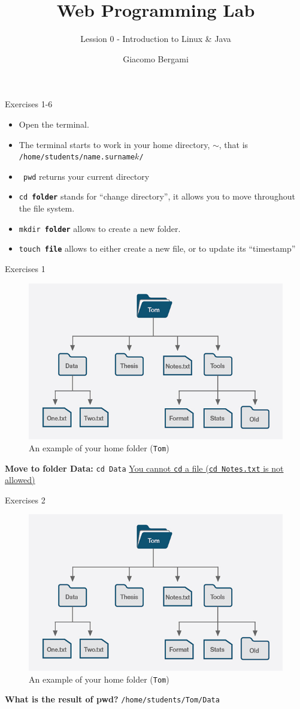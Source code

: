 \documentclass{beamer}
\title{Web Programming Lab}
\subtitle{Lession 0 - Introduction to Linux \& Java}
\author{Giacomo Bergami}
\institute{University of Bologna}
\begin{document}
  \begin{frame}{Exercises 1-6}
    \begin{itemize}
    	\item Open the terminal. 
    	\item The terminal starts to work in your home directory, $\sim$, that is \texttt{/home/students/name.surname$k$/}
    	\item \texttt{\color{green} pwd} returns your current directory
    	\item \texttt{\color{green}cd \textbf{\color{red}folder}} stands for ``change directory'', it allows you to move throughout the file system.
    	\item \texttt{\color{green}mkdir \textbf{\color{red}folder}} allows to create a new folder.
    	\item \texttt{\color{green}touch \textbf{\color{red}file}} allows to either create a new file, or to update its ``timestamp''
    \end{itemize}
  \end{frame}

\begin{frame}{Exercises 1}
\begin{figure}
	\centering
	\includegraphics[width=0.7\linewidth]{00shell}
	\caption{An example of your home folder (\texttt{Tom})}
	\label{fig:00shell}
\end{figure}
\textbf{Move to folder Data:} \pause \texttt{cd Data}
\underline{You cannot \texttt{cd} a file (\texttt{cd Notes.txt} is not allowed)}
\end{frame}

\begin{frame}{Exercises 2}
	\begin{figure}
		\centering
		\includegraphics[width=0.7\linewidth]{00shell}
		\caption{An example of your home folder (\texttt{Tom})}
		\label{fig:00shell}
	\end{figure}
	\textbf{What is the result of pwd?} \pause \texttt{/home/students/Tom/Data}
\end{frame}
\end{document}
